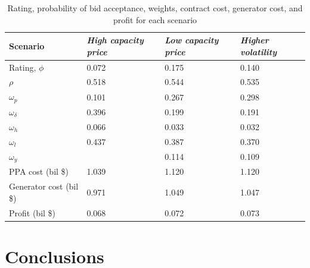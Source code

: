 \documentclass[informs]{informs3}
\begin{document}
\begin{table}[tableResults]
\caption {Rating, probability of bid acceptance, weights, contract cost, generator cost, and profit for each scenario} \label{tableResults}
\begin{tabular}{@{}llll@{}}
\toprule
Scenario                & \textit{High capacity price} & \textit{Low capacity price} & \textit{Higher volatility} \\ \midrule
Rating, $\phi$          & 0.072                          & 0.175                         & 0.140                             \\
$\rho$                  & 0.518                          & 0.544                         & 0.535                             \\
$\omega_p$              & 0.101                          & 0.267                         & 0.298                             \\
$\omega_{\delta}$       & 0.396                          & 0.199                         & 0.191                             \\
$\omega_h$              & 0.066                          & 0.033                         & 0.032                             \\
$\omega_l$              & 0.437                          & 0.387                         & 0.370                             \\
$\omega_y$              &                                & 0.114                         & 0.109                             \\
PPA cost (bil \$)       & 1.039                          & 1.120                         & 1.120                             \\
Generator cost (bil \$) & 0.971                          & 1.049                         & 1.047                             \\
Profit (bil \$)         & 0.068                          & 0.072                         & 0.073                             \\ \bottomrule
\end{tabular}
\end{table}




\section{Conclusions}\label{Conclusions}


\end{document}
